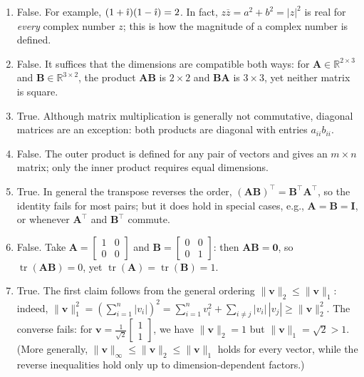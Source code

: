 \begin{solution}
    \begin{enumerate}[label=(\alphalphenum*)]
        \item False. For example, $(1+\hat{\imath})(1-\hat{\imath}) = 2$. In fact, $z\overline{z} = a^2 + b^2 = |z|^2$ is real for \emph{every} complex number $z$; this is how the magnitude of a complex number is defined.
        \item False. It suffices that the dimensions are compatible both ways: for $\mathbf{A} \in \mathbb{R}^{2\times3}$ and $\mathbf{B} \in \mathbb{R}^{3\times2}$, the product $\mathbf{A}\mathbf{B}$ is $2\times2$ and $\mathbf{B}\mathbf{A}$ is $3\times3$, yet neither matrix is square.
        \item True. Although matrix multiplication is generally not commutative, diagonal matrices are an exception: both products are diagonal with entries $a_{ii} b_{ii}$.
        \item False. The outer product is defined for any pair of vectors and gives an $m \times n$ matrix; only the inner product requires equal dimensions.
        \item True. In general the transpose reverses the order, $(\mathbf{A}\mathbf{B})^\top = \mathbf{B}^\top\mathbf{A}^\top$, so the identity fails for most pairs; but it does hold in special cases, e.g., $\mathbf{A} = \mathbf{B} = \mathbf{I}$, or whenever $\mathbf{A}^\top$ and $\mathbf{B}^\top$ commute.
        \item False. Take $\mathbf{A} = \begin{bmatrix} 1 & 0 \\ 0 & 0 \end{bmatrix}$ and $\mathbf{B} = \begin{bmatrix} 0 & 0 \\ 0 & 1 \end{bmatrix}$: then $\mathbf{A}\mathbf{B} = \mathbf{0}$, so $\operatorname{tr}(\mathbf{A}\mathbf{B}) = 0$, yet $\operatorname{tr}(\mathbf{A}) = \operatorname{tr}(\mathbf{B}) = 1$.
        \item True. The first claim follows from the general ordering $\|\mathbf{v}\|_2 \leq \|\mathbf{v}\|_1$: indeed, $\|\mathbf{v}\|_1^2 = \left(\sum_{i=1}^n |v_i|\right)^2 = \sum_{i=1}^n v_i^2 + \sum_{i \neq j} |v_i|\,|v_j| \geq \|\mathbf{v}\|_2^2$. The converse fails: for $\mathbf{v} = \frac{1}{\sqrt{2}}\begin{bmatrix} 1 \\ 1 \end{bmatrix}$, we have $\|\mathbf{v}\|_2 = 1$ but $\|\mathbf{v}\|_1 = \sqrt{2} > 1$. (More generally, $\|\mathbf{v}\|_\infty \leq \|\mathbf{v}\|_2 \leq \|\mathbf{v}\|_1$ holds for every vector, while the reverse inequalities hold only up to dimension-dependent factors.)

\end{enumerate}
\end{solution}

